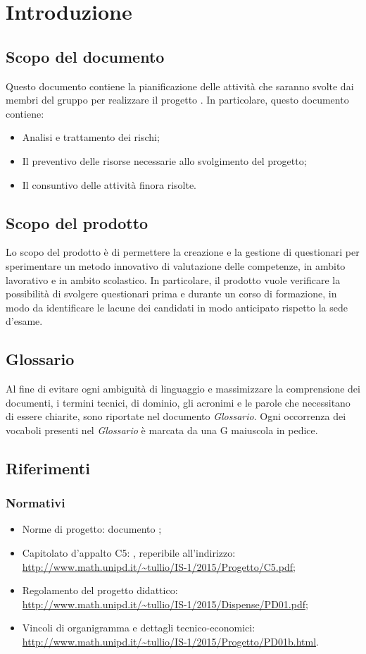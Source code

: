 \section{Introduzione}
\subsection{Scopo del documento}
Questo documento contiene la pianificazione delle attività che saranno svolte dai membri del gruppo \gruppo per realizzare il progetto \progetto. In particolare, questo documento contiene:

	\begin{itemize}
		\item Analisi e trattamento dei rischi;
		\item Il preventivo delle risorse necessarie allo svolgimento del progetto;
		\item Il consuntivo delle attività finora risolte.
	\end{itemize}
	
\subsection{Scopo del prodotto}
Lo scopo del prodotto è di permettere la creazione e la gestione di questionari per sperimentare un metodo innovativo di valutazione delle competenze, in ambito lavorativo e in ambito scolastico. In particolare, il prodotto vuole verificare la possibilità di svolgere questionari prima e durante un corso di formazione, in modo da identificare le lacune dei candidati in modo anticipato rispetto la sede d'esame.
\subsection{Glossario}
Al fine di evitare ogni ambiguità di linguaggio e massimizzare la comprensione dei documenti, i termini tecnici, di dominio, gli acronimi e le parole che necessitano di essere chiarite, sono riportate nel documento \textit{Glossario}. Ogni occorrenza dei vocaboli presenti nel \textit{Glossario} è marcata da una G maiuscola in pedice.
\subsection{Riferimenti}
\subsubsection{Normativi}
	\begin{itemize}
		\item Norme di progetto: documento \textit{\NdP};
		\item Capitolato d'appalto C5: \progetto, reperibile all'indirizzo:\\
		\url{http://www.math.unipd.it/~tullio/IS-1/2015/Progetto/C5.pdf};
		\item Regolamento del progetto didattico:\\
		\url{http://www.math.unipd.it/~tullio/IS-1/2015/Dispense/PD01.pdf};
		\item Vincoli di organigramma e dettagli tecnico-economici:\\
		\url{http://www.math.unipd.it/~tullio/IS-1/2015/Progetto/PD01b.html}.
	\end{itemize}

